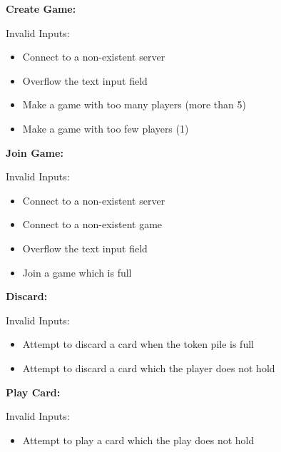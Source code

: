 \documentclass[12pt]{article}
\begin{document}
\begin{description}
\item
\begin{description}
	\item \textbf{Create Game:}
	\item Invalid Inputs:
		\begin{itemize}
		\item Connect to a non-existent server
		\item Overflow the text input field
		\item Make a game with too many players (more than 5)
		\item Make a game with too few players (1)
		\end{itemize}	
\end{description}

\item
\begin{description}
	\item \textbf{Join Game:}
	\item Invalid Inputs:
		\begin{itemize}
		\item Connect to a non-existent server
		\item Connect to a non-existent game
		\item Overflow the text input field
		\item Join a game which is full
		\end{itemize}	
\end{description}	


\item
\begin{description}
	\item \textbf{Discard:}
	\item Invalid Inputs:
		\begin{itemize}
		\item Attempt to discard a card when the token pile is full
		\item Attempt to discard a card which the player does not hold
		\end{itemize}	
\end{description}	

\item
\begin{description}
	\item \textbf{Play Card:}
	\item Invalid Inputs:
		\begin{itemize}
		\item Attempt to play a card which the play does not hold
		\end{itemize}	
\end{description}	


\end{description}
\end{document}
